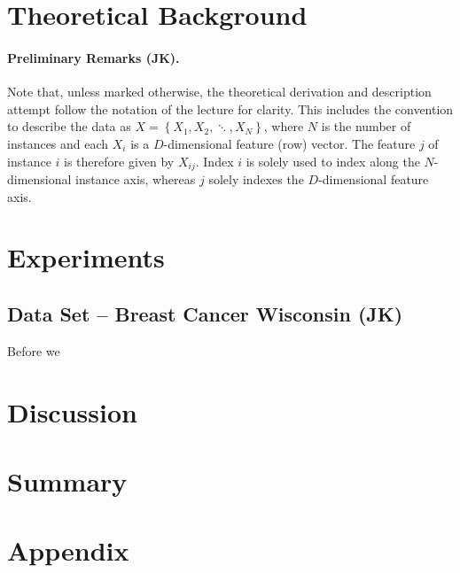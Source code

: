 \documentclass[11pt, a4paper]{scrartcl}
\begin{document}

\section{Theoretical Background}
\label{sec:theo}

\paragraph{Preliminary Remarks (JK).}
Note that, unless marked otherwise, the theoretical derivation and description attempt follow the notation of the lecture \cite{kothe2018foml} for clarity.
This includes the convention to describe the data as $X = \left\{ X_1, X_2, \ddots, X_N \right\}$, where $N$ is the number of instances and each $X_i$ is a $D$-dimensional feature (row) vector. The feature $j$  of instance $i$ is therefore given by $X_{ij}$.  Index $i$ is solely used to index along the $N$-dimensional instance axis, whereas $j$ solely indexes the $D$-dimensional feature axis.




\section{Experiments}
\label{sec:expe}

\subsection{Data Set -- Breast Cancer Wisconsin (JK)}
Before we 


\section{Discussion}
\label{sec:discu}

\section{Summary}

\section{Appendix}




\end{document}
